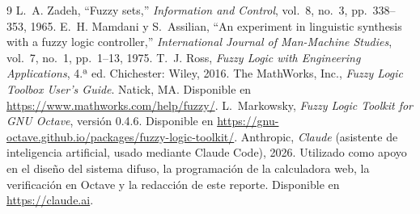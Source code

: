 \documentclass[11pt,letterpaper]{article}
\begin{document}
\begin{thebibliography}{9}
 L.~A. Zadeh, ``Fuzzy sets,'' \emph{Information and Control}, vol.~8, no.~3, pp.~338--353, 1965.
 E.~H. Mamdani y S.~Assilian, ``An experiment in linguistic synthesis with a fuzzy logic controller,'' \emph{International Journal of Man-Machine Studies}, vol.~7, no.~1, pp.~1--13, 1975.
 T.~J. Ross, \emph{Fuzzy Logic with Engineering Applications}, 4.ª ed. Chichester: Wiley, 2016.
 The MathWorks, Inc., \emph{Fuzzy Logic Toolbox User's Guide}. Natick, MA. Disponible en \url{https://www.mathworks.com/help/fuzzy/}.
 L.~Markowsky, \emph{Fuzzy Logic Toolkit for GNU Octave}, versión 0.4.6. Disponible en \url{https://gnu-octave.github.io/packages/fuzzy-logic-toolkit/}.
 Anthropic, \emph{Claude} (asistente de inteligencia artificial, usado mediante Claude Code), 2026. Utilizado como apoyo en el diseño del sistema difuso, la programación de la calculadora web, la verificación en Octave y la redacción de este reporte. Disponible en \url{https://claude.ai}.
\end{thebibliography}
\end{document}

